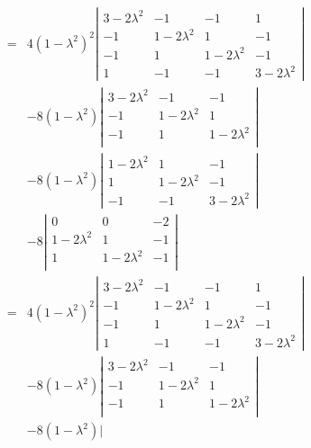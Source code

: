 \documentclass[letterpaper,11pt]{article}
\begin{document}
\begin{eqnarray*}
 & = & 4 \left( 1 - \lambda^2 \right)^2 \left| \begin{array}{cccc}
 3 - 2 \lambda^2 & -1 & -1 & 1 \\
 -1 & 1 - 2 \lambda^2 & 1 & -1 \\
 -1 & 1 & 1 - 2 \lambda^2 & -1 \\
 1 & -1 & -1 & 3 - 2 \lambda^2
 \end{array} \right| \\
 & & - 8 \left( 1 - \lambda^2 \right) \left| \begin{array}{cccc}
 3 - 2 \lambda^2 & -1 & -1 \\
 -1 & 1 - 2 \lambda^2 & 1 \\
 -1 & 1 & 1 - 2 \lambda^2 \\
 \end{array} \right| \\
 & & - 8 \left( 1 - \lambda^2 \right) \left| \begin{array}{ccc}
 1 - 2 \lambda^2 & 1 & -1 \\
 1 & 1 - 2 \lambda^2 & -1 \\
 -1 & -1 & 3 - 2 \lambda^2
 \end{array} \right| \\
 & & - 8 \left| \begin{array}{ccc}
 0 & 0 & -2 \\
 1 - 2 \lambda^2 & 1 & -1 \\
 1 & 1 - 2 \lambda^2 & -1 \\
 \end{array} \right| \\
 & = & 4 \left( 1 - \lambda^2 \right)^2 \left| \begin{array}{cccc}
 3 - 2 \lambda^2 & -1 & -1 & 1 \\
 -1 & 1 - 2 \lambda^2 & 1 & -1 \\
 -1 & 1 & 1 - 2 \lambda^2 & -1 \\
 1 & -1 & -1 & 3 - 2 \lambda^2
 \end{array} \right| \\
 & & - 8 \left( 1 - \lambda^2 \right) \left| \begin{array}{cccc}
 3 - 2 \lambda^2 & -1 & -1 \\
 -1 & 1 - 2 \lambda^2 & 1 \\
 -1 & 1 & 1 - 2 \lambda^2 \\
 \end{array} \right| \\
 & & - 8 \left( 1 - \lambda^2 \right) \left| \begin{array}{ccc}

\end{array}
\end{eqnarray*}
\end{document}
